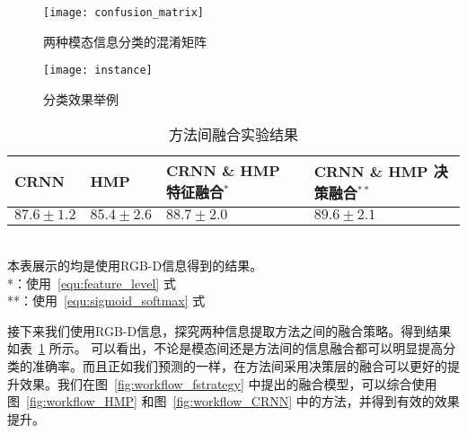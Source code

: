 \begin{figure}[H] %
  \centering
  \texttt{[image: confusion\_matrix]}
  \caption{两种模态信息分类的混淆矩阵}
  \label{fig:confusion_matrix}
\end{figure}

\begin{figure}[H] %
  \centering
  \texttt{[image: instance]}
  \caption{分类效果举例}
  \label{fig:instance}
\end{figure}

\begin{table}[htbp]
  \centering
  \caption{方法间融合实验结果}
  \label{tab:fStrategyResult2}
  \begin{minipage}[t]{0.8\textwidth} 
    \begin{tabularx}{\linewidth}{|X|X|X|X|}
      \hline
      CRNN & HMP & CRNN \& HMP 特征融合$^{*}$ & CRNN \& HMP 决策融合$^{**}$ \\ \hline
      $87.6 \pm 1.2$ & $85.4 \pm 2.6$ & $88.7 \pm 2.0$ & $\boldsymbol{89.6 \pm 2.1}$ \\ \hline
    \end{tabularx}\\[2pt]
    \footnotesize
    本表展示的均是使用RGB-D信息得到的结果。\\
    *：使用~\ref{equ:feature_level} 式\\
    **：使用~\ref{equ:sigmoid_softmax} 式
  \end{minipage}
\end{table}

接下来我们使用RGB-D信息，探究两种信息提取方法之间的融合策略。得到结果如表~\ref{tab:fStrategyResult2} 所示。
可以看出，不论是模态间还是方法间的信息融合都可以明显提高分类的准确率。而且正如我们预测的一样，在方法间采用决策层的融合可以更好的提升效果。我们在图~\ref{fig:workflow_fstrategy} 中提出的融合模型，可以综合使用图~\ref{fig:workflow_HMP} 和图~\ref{fig:workflow_CRNN} 中的方法，并得到有效的效果提升。